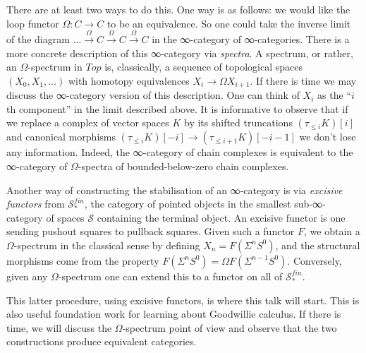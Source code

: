 \documentclass[a4paper]{amsart}
\numberwithin{figure}{section}
\theoremstyle{theorem}
\theoremstyle{definition}
\newcommand{\ZZ}{\mathbb{Z}}
\newcommand{\Top}{{Top}}
\newcommand{\Spaces}{{\mathcal{S}}}
\begin{document}
There are at least two ways to do this. One way is as follows: we would like the loop functor $\Omega: C \to C$ to be an equivalence. So one could take the inverse limit of the diagram $\dots \stackrel{\Omega}{\to} C \stackrel{\Omega}{\to} C \stackrel{\Omega}{\to} C$ in the ∞-category of ∞-categories. There is a more concrete description of this ∞-category via \emph{spectra}. A spectrum, or rather, an $\Omega$-spectrum in $\Top$ is, classically, a sequence of topological spaces $(X_0, X_1, \dots)$ with homotopy equivalences $X_i → \Omega X_{i+1}$. If there is time we may discuss the ∞-category version of this description. One can think of $X_i$ as the ``$i$th component'' in the limit described above. It is informative to observe that if we replace a complex of vector spaces $K$ by its shifted truncations $(\tau_{\leq i}K)[i]$ and canonical morphisms $(\tau_{\leq i}K)[{-}i] \to (\tau_{\leq {i+1}}K)[{-}i{-}1]$ we don't lose any information. Indeed, the ∞-category of chain complexes is equivalent to the ∞-category of $\Omega$-spectra of bounded-below-zero chain complexes.

Another way of constructing the stabilisation of an ∞-category is via \emph{excisive functors} from $\Spaces^{fin}_*$, the category of pointed objects in the smallest sub-∞-category of spaces $\Spaces$ containing the terminal object. An excisive functor is one sending pushout squares to pullback squares. Given such a functor $F$, we obtain a $\Omega$-spectrum in the classical sense by defining $X_n = F(\Sigma^n S^0)$, and the structural morphisms come from the property $F(\Sigma^n S^0) = \Omega F(\Sigma^{n-1} S^0)$. Conversely, given any $\Omega$-spectrum one can extend this to a functor on all of $\Spaces^{fin}_*$. 

This latter procedure, using excisive functors, is where this talk will start. This is also useful foundation work for learning about Goodwillie calculus. If there is time, we will discuss the $\Omega$-spectrum point of view and observe that the two constructions produce equivalent categories.

\end{document}
